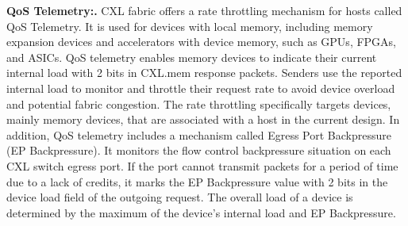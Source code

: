\noindent \textbf{QoS Telemetry:.}
CXL fabric offers a rate throttling mechanism for hosts called QoS Telemetry.
%
It is used for devices with local memory, including memory expansion devices and accelerators with device memory, such as GPUs, FPGAs, and ASICs.
%
QoS telemetry enables memory devices to indicate their current internal load with 2 bits in CXL.mem response packets.
%
Senders use the reported internal load to monitor and throttle their request rate to avoid device overload and potential fabric congestion.
%
The rate throttling specifically targets devices, mainly memory devices, that are associated with a host in the current design.
%
In addition, QoS telemetry includes a mechanism called Egress Port Backpressure (EP Backpressure).
%
It monitors the flow control backpressure situation on each CXL switch egress port.
%
If the port cannot transmit packets for a period of time due to a lack of credits, it marks the EP Backpressure value with 2 bits in the device load field of the outgoing request.
%
The overall load of a device is determined by the maximum of the device's internal load and EP Backpressure.


